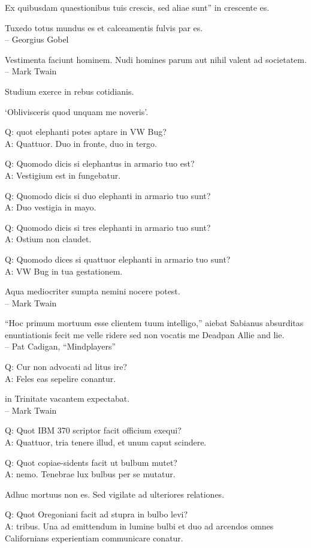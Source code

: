 \documentclass[titlepage,12pt]{memoir}
\begin{document}
Ex quibusdam quaestionibus tuis crescis, sed aliae sunt”
in crescente es.

Tuxedo totus mundus es et calceamentis fulvis par es.
\\-- Georgius Gobel

Vestimenta faciunt hominem. Nudi homines parum aut nihil valent ad societatem.
\\-- Mark Twain

Studium exerce in rebus cotidianis.

‘Oblivisceris quod unquam me noveris’.

Q: quot elephanti potes aptare in VW Bug?\\
A: Quattuor. Duo in fronte, duo in tergo.

Q: Quomodo dicis si elephantus in armario tuo est?\\
A: Vestigium est in fungebatur.

Q: Quomodo dicis si duo elephanti in armario tuo sunt?\\
A: Duo vestigia in mayo.

Q: Quomodo dicis si tres elephanti in armario tuo sunt?\\
A: Ostium non claudet.

Q: Quomodo dices si quattuor elephanti in armario tuo sunt?\\
A: VW Bug in tua gestationem.

Aqua mediocriter sumpta nemini nocere potest.
\\-- Mark Twain

 “Hoc primum mortuum esse clientem tuum intelligo,” aiebat Sabianus
absurditas enuntiationis fecit me velle ridere sed non vocatis me
Deadpan Allie and lie.
\\-- Pat Cadigan, “Mindplayers”

Q: Cur non advocati ad litus ire?\\
A: Feles eas sepelire conantur.

in Trinitate vacantem expectabat.
\\-- Mark Twain

Q: Quot IBM 370 scriptor facit officium exequi?\\
A: Quattuor, tria tenere illud, et unum caput scindere.

Q: Quot copiae-sidents facit ut bulbum mutet?\\
A: nemo. Tenebrae lux bulbus per se mutatur.

Adhuc mortuus non es. Sed vigilate ad ulteriores relationes.

Q: Quot Oregoniani facit ad stupra in bulbo levi?\\
A: tribus. Una ad emittendum in lumine bulbi et duo ad arcendos omnes
Californians experientiam communicare conatur.
\end{document}
